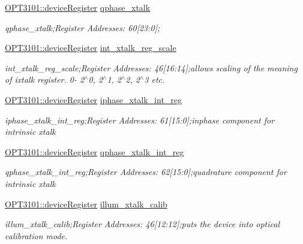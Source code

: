 \begin{DoxyCompactItemize}
\mbox{\hyperlink{class_o_p_t3101_1_1device_register}{O\+P\+T3101\+::device\+Register}} \mbox{\hyperlink{class_o_p_t3101_1_1registers_ad94d98dfb26313a9d32c5c2c0c673693}{qphase\+\_\+xtalk}}
\begin{DoxyCompactList}\small\item\em qphase\+\_\+xtalk;Register Addresses\+: 60\mbox{[}23\+:0\mbox{]}; \end{DoxyCompactList}\item 
\mbox{\hyperlink{class_o_p_t3101_1_1device_register}{O\+P\+T3101\+::device\+Register}} \mbox{\hyperlink{class_o_p_t3101_1_1registers_acff4e2c6f9916202d0e3d82974b15e92}{int\+\_\+xtalk\+\_\+reg\+\_\+scale}}
\begin{DoxyCompactList}\small\item\em int\+\_\+xtalk\+\_\+reg\+\_\+scale;Register Addresses\+: 46\mbox{[}16\+:14\mbox{]};allows scaling of the meaning of ixtalk register. 0-\/ 2$^\wedge$0, 2$^\wedge$1, 2$^\wedge$2, 2$^\wedge$3 etc. \end{DoxyCompactList}\item 
\mbox{\hyperlink{class_o_p_t3101_1_1device_register}{O\+P\+T3101\+::device\+Register}} \mbox{\hyperlink{class_o_p_t3101_1_1registers_af885fac652ff2f4e994d1b3a5284dca1}{iphase\+\_\+xtalk\+\_\+int\+\_\+reg}}
\begin{DoxyCompactList}\small\item\em iphase\+\_\+xtalk\+\_\+int\+\_\+reg;Register Addresses\+: 61\mbox{[}15\+:0\mbox{]};inphase component for intrinsic xtalk \end{DoxyCompactList}\item 
\mbox{\hyperlink{class_o_p_t3101_1_1device_register}{O\+P\+T3101\+::device\+Register}} \mbox{\hyperlink{class_o_p_t3101_1_1registers_ae7d09c6f98abea5bc6b0712eb5218453}{qphase\+\_\+xtalk\+\_\+int\+\_\+reg}}
\begin{DoxyCompactList}\small\item\em qphase\+\_\+xtalk\+\_\+int\+\_\+reg;Register Addresses\+: 62\mbox{[}15\+:0\mbox{]};quadrature component for intrinsic xtalk \end{DoxyCompactList}\item 
\mbox{\hyperlink{class_o_p_t3101_1_1device_register}{O\+P\+T3101\+::device\+Register}} \mbox{\hyperlink{class_o_p_t3101_1_1registers_a9beada413a32d63b80f9bf3630045eef}{illum\+\_\+xtalk\+\_\+calib}}
\begin{DoxyCompactList}\small\item\em illum\+\_\+xtalk\+\_\+calib;Register Addresses\+: 46\mbox{[}12\+:12\mbox{]};puts the device into optical calibration mode. \end{DoxyCompactList}\item 

\end{DoxyCompactItemize}
